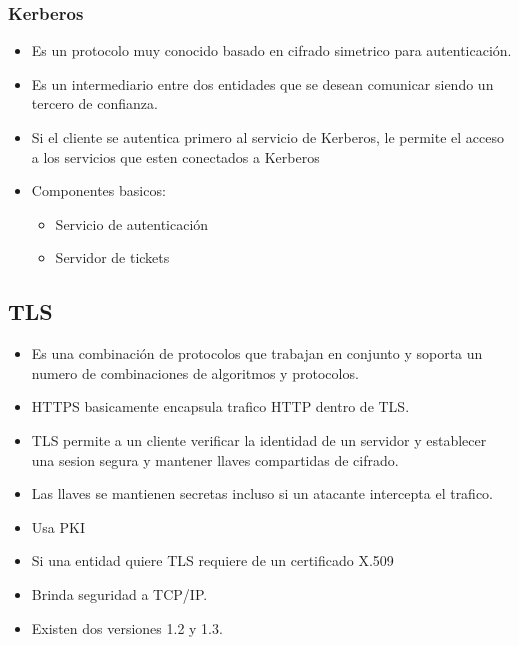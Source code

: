 \documentclass[11pt]{article}
\begin{document}
\subsubsection{Kerberos}
\label{sec:orgdb09f56}
\begin{itemize}
\item Es un protocolo muy conocido basado en cifrado simetrico para autenticación.
\item Es un intermediario entre dos entidades que se desean comunicar siendo un tercero de confianza.
\item Si el cliente se autentica primero al servicio de Kerberos, le permite el acceso a los servicios que esten conectados a Kerberos
\item Componentes basicos:
\begin{itemize}
\item Servicio de autenticación
\item Servidor de tickets
\end{itemize}
\end{itemize}
\subsection{TLS}
\label{sec:org65de22d}
\begin{itemize}
\item Es una combinación de protocolos que trabajan en conjunto y soporta un numero de combinaciones de algoritmos y protocolos.
\item HTTPS basicamente encapsula trafico HTTP dentro de TLS.
\item TLS permite a un cliente verificar la identidad de un servidor y establecer una sesion segura y mantener llaves compartidas de cifrado.
\item Las llaves se mantienen secretas incluso si un atacante intercepta el trafico.
\item Usa PKI
\item Si una entidad quiere TLS requiere de un certificado X.509
\item Brinda seguridad a TCP/IP.
\item Existen dos versiones 1.2 y 1.3.
\end{itemize}
\end{document}
